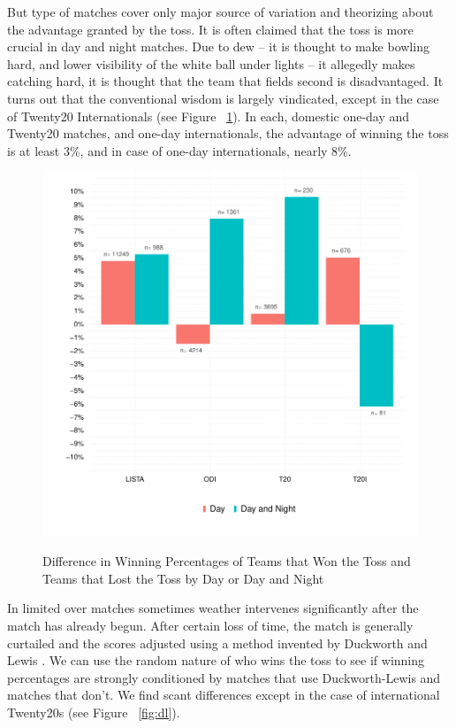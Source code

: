 \documentclass[12pt]{article}
\begin{document}
But type of matches cover only major source of variation and theorizing about the advantage granted by the toss. It is often claimed that the toss is more crucial in day and night matches. Due to dew -- it is thought to make bowling hard, and lower visibility of the white ball under lights -- it allegedly makes catching hard, it is thought that the team that fields second is disadvantaged. It turns out that the conventional wisdom is largely vindicated, except in the case of Twenty20 Internationals (see Figure ~\ref{fig:dn}). In each, domestic one-day and Twenty20 matches, and one-day internationals, the advantage of winning the toss is at least 3\%, and in case of one-day internationals, nearly 8\%.

\begin{figure}[htbp]
\centering
\caption{Difference in Winning Percentages of Teams that Won the Toss and Teams that Lost the Toss by Day or Day and Night}
\includegraphics[scale=.85]{../figs/winbyDayNight.pdf}
\label{fig:dn}
\end{figure}

In limited over matches sometimes weather intervenes significantly after the match has already begun. After certain loss of time, the match is generally curtailed and the scores adjusted using a method invented by Duckworth and Lewis \citep[see][]{duckworth1998}. We can use the random nature of who wins the toss to see if winning percentages are strongly conditioned by matches that use Duckworth-Lewis and matches that don't. We find scant differences except in the case of international Twenty20s (see Figure ~\ref{fig:dl}).
\end{document}
